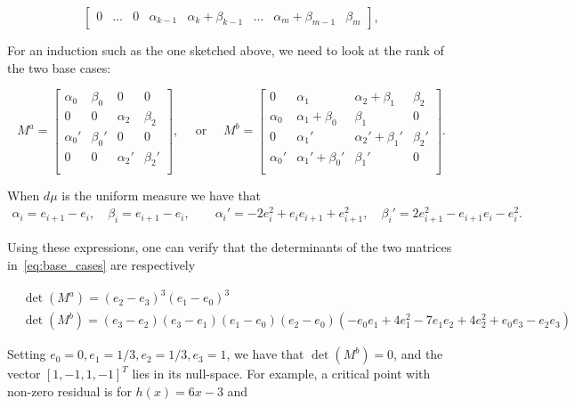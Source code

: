 \documentclass{article}
\begin{document}
\[
\begin{bmatrix}
    0 & \ldots & 0 & \alpha_{k-1} & \alpha_k + \beta_{k-1} & \ldots & \alpha_m
    + \beta_{m-1} & \beta_{m}
\end{bmatrix},
\]

For an induction such as the one sketched above, we need to look at the rank
of the two base cases:


\begin{equation}\label{eq:base_cases}
M^a = 
\begin{bmatrix}
    \alpha_0 & \beta_0 & 0 & 0 \\
    0 & 0 & \alpha_2 & \beta_2 \\
    \alpha_0' & \beta_0' & 0 & 0 \\
    0 & 0 & \alpha_2' & \beta_2' \\
\end{bmatrix},
\quad \mbox{ or } \quad
M^b = 
\begin{bmatrix}
    0 & \alpha_1 & \alpha_2 + \beta_1 & \beta_2 \\
    \alpha_0 & \alpha_1 + \beta_0 & \beta_1 & 0 \\
    0 & \alpha_1' & \alpha_2' + \beta_1' & \beta_2' \\
    \alpha_0' & \alpha_1' + \beta_0' & \beta_1' & 0 \\
\end{bmatrix}.
\end{equation}


When $d \mu$ is the uniform measure we have that
\begin{equation}
\begin{aligned}
\alpha_i = e_{i+1} - e_{i}, \quad \beta_i = e_{i+1} - e_{i}, \qquad \alpha_i' =
-2e^2_{i} +  e_{i}e_{i+1} + e_{i+1}^2, \quad \beta_i' = {2e^2_{i+1} -
e_{i+1}e_i - e_i^2}.
\end{aligned}
\end{equation}

Using these expressions, one can verify that the determinants of the two
matrices in~\eqref{eq:base_cases} are respectively

\[
\begin{aligned}
&\det(M^a) =  (e_2 - e_3)^3(e_1 - e_0)^3\\
&\det(M^b) = (e_3 - e_{2})(e_3 - e_{1})(e_{1}-e_0)(e_2 - e_{0}) (- e_{0} e_{1} + 4
e_{1}^{2} - 7 e_{1} e_{2} + 4 e_{2}^{2} + e_{0} e_{3} -  e_{2} e_{3})
\end{aligned}
\]


Setting $e_0 = 0,e_1 = 1/3, e_2 = 1/3, e_3 = 1$, we have that $\det(M^b) = 0$, and the vector $[1,-1,1,-1]^T$ lies in its null-space. For example, a critical point with non-zero residual is for $h(x) = 6x - 3$ and
\end{document}
